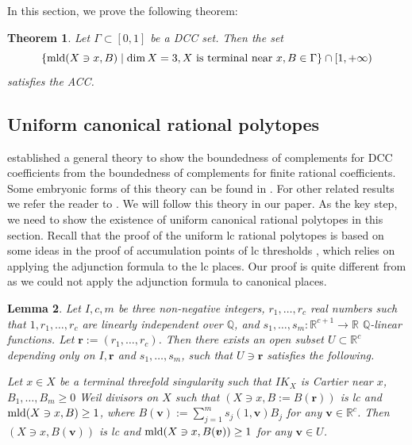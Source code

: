\documentclass[11pt]{amsart}
\numberwithin{equation}{section}
\newcommand\han[1]{\todo[color=yellow!40]{#1}} %
\newcommand{\Qq}{\mathbb{Q}}
\newcommand{\Rr}{\mathbb{R}}
\newcommand{\mld}{{\rm{mld}}}
\newcommand{\Ii}{{\Gamma}}
\newtheorem{thm}{Theorem}[section]
\newtheorem{lem}[thm]{Lemma}
\theoremstyle{definition}
\theoremstyle{definition}
\begin{document}
In this section, we prove the following theorem:

\begin{thm}\label{thm:  terminal mld acc}
Let $\Ii\subset [0,1]$ be a DCC set. Then the set
$$\{\mld(X\ni x,B)\mid \dim X=3, X\text{ is terminal near $x$},B\in\Ii\}\cap [1,+\infty)$$
satisfies the ACC.
\end{thm}

\subsection{Uniform canonical rational polytopes}\label{subsection: uniform can rational polytope}




\cite{HLS19} established a general theory to show the boundedness of complements for DCC coefficients from the boundedness of complements for finite rational coefficients. Some embryonic forms of this theory can be found in \cite{Kaw14,Nak16,Liu18}. For other related results we refer the reader to \cite{Che20,HLQ20,CH21,HLQ21}.
We will follow this theory in our paper. As the key step, we need to show the existence of uniform canonical rational polytopes in this section. Recall that the proof of the uniform lc rational polytopes \cite{HLS19} is based on some ideas in the proof of accumulation points of lc
thresholds \cite{HMX14}, which relies on applying the adjunction formula to the lc places. Our proof is quite different from \cite{HLS19} as we could not apply the adjunction formula to canonical places.


\begin{lem}\label{lem: fixed germ uniform canonical polytope}
Let $I,c,m$ be three non-negative integers, $r_1,\dots,r_c$ real numbers such that $1,r_1,\dots,r_c$ are linearly independent over $\Qq$, and $s_1,\dots,s_m:\mathbb R^{c+1}\rightarrow\mathbb R$ $\Qq$-linear functions. Let $\bm{r}:=(r_1,\dots,r_c)$. Then there exists an open subset $U\subset\mathbb R^c$ depending only on $I,\bm{r}$ and $s_1,\dots,s_m$, such that $U\ni\bm{r}$ satisfies the following.

Let $x\in X$ be a terminal threefold singularity such that $IK_X$ is Cartier near $x$, $B_1,\dots,B_m\geq 0$ Weil divisors on $X$ such that $(X\ni x,B:=B(\bm{r}))$ is lc and $\mld(X\ni x,B)\geq 1$, where $B(\bm{v}):=\sum_{j=1}^ms_j(1,\bm{v})B_j$ for any $\bm{v}\in\Rr^c$. Then $(X\ni x,B(\bm{v}))$ is lc and $\mld(X\ni x,B(\bm v))\geq 1$ for any $\bm{v}\in U$.
\end{lem}
\end{document}
